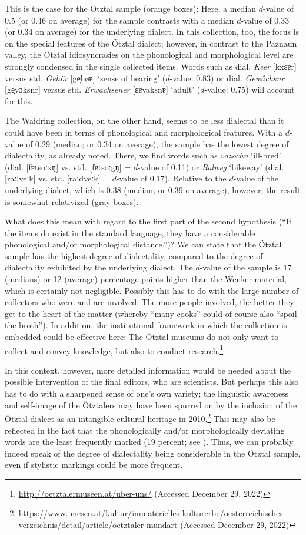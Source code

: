 \documentclass[output=paper]{langscibook}
\begin{document}
This is the case for the Ötztal sample (orange boxes): Here, a median $d$-value of 0.5 (or 0.46 on average) for the sample contrasts with a median $d$-value of 0.33 (or 0.34 on average) for the underlying dialect. In this collection, too, the focus is on the special features of the Ötztal dialect; however, in contrast to the Paznaun valley, the Ötztal idiosyncrasies on the phonological and morphological level are strongly condensed in the single collected items. Words such as dial. \textit{Keer} [kxɛɐr] versus std. \textit{Gehör} [ge̞høɐ] ‘sense of hearing’ ($d$-value: 0.83) or dial. \textit{Gewåchsnr} [ge̞vɔksnr] versus std. \textit{Erwachsener} [ɛɐvaksnɐ] ‘adult’ ($d$-value: 0.75) will account for this.

The Waidring collection, on the other hand, seems to be less dialectal than it could have been in terms of phonological and morphological features. With a $d$-value of 0.29 (median; or 0.34 on average), the sample has the lowest degree of dialectality, as already noted. There, we find words such as \textit{vazochn} ‘ill-bred’ (dial. [fɐtsoːxŋ̩] vs. std. [fɐtsoːgŋ̩] = $d$-value of 0.11) or \textit{Ralweg} ‘bikeway’ (dial. [raːlveːk] vs. std. [raːdveːk] = $d$-value of 0.17). Relative to the $d$-value of the underlying dialect, which is 0.38 (median; or 0.39 on average), however, the result is somewhat relativized (gray boxes).

What does this mean with regard to the first part of the second hypothesis (``If the items do exist in the standard language, they have a considerable phonological and/or morphological distance.”)? We can state that the Ötztal sample has the highest degree of dialectality, compared to the degree of dialectality exhibited by the underlying dialect. The $d$-value of the sample is 17 (medians) or 12 (average) percentage points higher than the Wenker material, which is certainly not negligible. Possibly this has to do with the large number of collectors who were and are involved: The more people involved, the better they get to the heart of the matter (whereby “many cooks” could of course also “spoil the broth”). In addition, the institutional framework in which the collection is embedded could be effective here: The Ötztal museums do not only want to collect and convey knowledge, but also to conduct research.\footnote{\url{http://oetztalermuseen.at/uber-uns/} (Accessed December 29, 2022)}

In this context, however, more detailed information would be needed about the possible intervention of the final editors, who are scientists. But perhaps this also has to do with a sharpened sense of one’s own variety; the linguistic awareness and self-image of the Ötztalers may have been spurred on by the inclusion of the Ötztal dialect as an intangible cultural heritage in 2010.\footnote{\url{https://www.unesco.at/kultur/immaterielles-kulturerbe/oesterreichisches-verzeichnis/detail/article/oetztaler-mundart} (Accessed December 29, 2022)} This may also be reflected in the fact that the phonologically and/or morphologically deviating words are the least frequently marked (19 percent; see ). Thus, we can probably indeed speak of the degree of dialectality being considerable in the Ötztal sample, even if stylistic markings could be more frequent.
\end{document}
